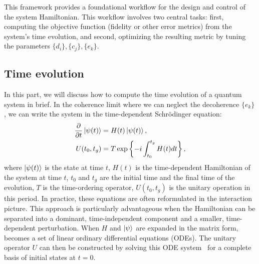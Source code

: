 \documentclass[a4paper,onecolumn,11pt,unpublished]{quantumarticle}
\newcommand{\setelem}[1]{\ensuremath{\{#1\}}}
\newcommand{\setelemthree}[3]{\setelem{#1},\setelem{#2},\setelem{#3}}
\begin{document}
This framework provides a foundational workflow for the design and control of the system Hamiltonian. This workflow involves two central tasks: first, computing the objective function (fidelity or other error metrics) from the system's time evolution, and second, optimizing the resulting metric by tuning the parameters $\setelemthree{d_i}{c_j}{e_k}$.

\subsection{Time evolution}

In this part, we will discuss how to compute the time evolution of a quantum system in brief. In the coherence limit where we can neglect the decoherence $\setelem{e_k}$, we can write the system in the time-dependent Schr\"odinger equation:
\begin{align}
  \frac{\partial }{\partial t}\ket{\psi(t)} & = H(t)\ket{\psi(t)}, \label{eq:psi_time_evo}                                     \\
  U(t_0,t_g)                                & = T \exp \left\{-i \int_{t_0}^{t_g} H(t) dt \right\}, \label{eq:u_from_time_evo}
\end{align}
where $\ket{\psi(t)}$ is the state at time $t$, $H(t)$ is the time-dependent Hamiltonian of the system at time $t$, $t_0$ and $t_g$ are the initial time and the final time of the evolution, $T$ is the time-ordering operator, $U(t_0, t_g)$ is the unitary operation in this period. In practice, these equations are often reformulated in the interaction picture. This approach is particularly advantageous when the Hamiltonian can be separated into a dominant, time-independent component and a smaller, time-dependent perturbation. When $H$ and $\ket{\psi}$ are expanded in the matrix form,~ becomes a set of linear ordinary differential equations (ODEs). The unitary operator $U$ can then be constructed by solving this ODE system~ for a complete basis of initial states at $t=0$. 
\end{document}
